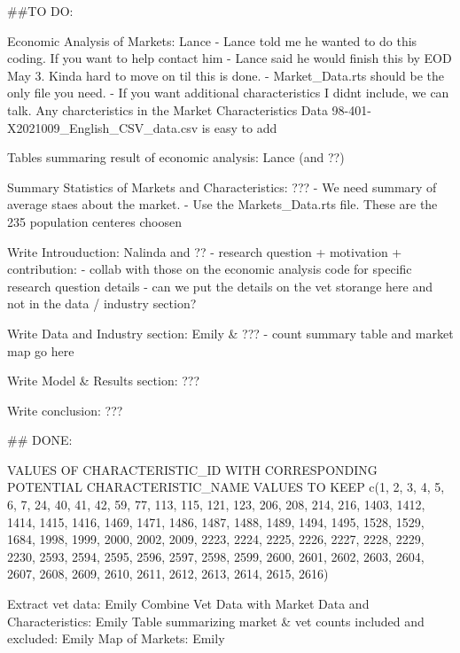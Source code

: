 ##TO DO:

Economic Analysis of Markets: Lance  
    - Lance told me he wanted to do this coding. If you want to help contact him  
    - Lance said he would finish this by EOD May 3. Kinda hard to move on til this is done.   
    - Market_Data.rts should be the only file you need. 
    - If you want additional characteristics I didnt include, we can talk. Any charcteristics in the Market Characteristics Data 98-401-X2021009_English_CSV_data.csv is easy to add

Tables summaring result of economic analysis: Lance (and ??)

Summary Statistics of Markets and Characteristics: ???
    - We need summary of average staes about the market. 
    - Use the Markets_Data.rts file. These are the 235 population centeres choosen

Write Introuduction: Nalinda and ??
    - research question + motivation + contribution: 
    - collab with those on the economic analysis code for specific research question details 
    - can we put the details on the vet storange here and not in the data / industry section? 

Write Data and Industry section: Emily & ???
    - count summary table and market map go here 

Write Model & Results section: ???

Write conclusion:  ???

## DONE: 

VALUES OF CHARACTERISTIC_ID WITH CORRESPONDING POTENTIAL CHARACTERISTIC_NAME VALUES TO KEEP 
c(1, 2, 3, 4, 5, 6, 7, 24, 40, 41, 42, 59, 77, 113, 115, 121, 123, 206, 208, 214, 216, 1403, 1412, 1414, 1415, 1416, 1469, 1471, 1486, 1487, 1488, 1489, 1494, 1495, 1528, 1529, 1684, 1998, 1999, 2000, 2002, 2009, 2223, 2224, 2225, 2226, 2227, 2228, 2229, 2230, 2593, 2594, 2595, 2596, 2597, 2598, 2599, 2600, 2601, 2602, 2603, 2604, 2607, 2608, 2609, 2610, 2611, 2612, 2613, 2614, 2615, 2616)

Extract vet data: Emily 
Combine Vet Data with Market Data and Characteristics: Emily 
Table summarizing market & vet counts included and excluded: Emily
Map of Markets: Emily 
